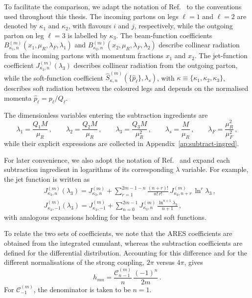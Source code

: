 To facilitate the comparison, we adapt the notation of
Ref.~\cite{Gaunt:2015pea} to the conventions used throughout this
thesis. The incoming partons on legs $\ell=1$ and $\ell=2$ are denoted
by $\kappa_1$ and $\kappa_2$, with flavours $i$ and $j$,
respectively, while the outgoing parton on leg $\ell=3$ is labelled by
$\kappa_3$. The beam-function coefficients
$B_{\kappa_1,n}^{(m)}(x_1,\mu_R,\lambda_F,\lambda_1)$ and
$B_{\kappa_2,n}^{(m)}(x_2,\mu_R,\lambda_F,\lambda_2)$ describe
collinear radiation from the incoming partons with momentum fractions
$x_1$ and $x_2$. The jet-function coefficient
$J_{\kappa_3,n}^{(m)}(\lambda_3)$ describes collinear radiation from the
outgoing parton, while the soft-function coefficient
$\widehat{S}_{\kappa,n}^{(m)}(\{\hat{p}_\ell\},\lambda_s)$, with
$\kappa\equiv\{\kappa_1,\kappa_2,\kappa_3\}$, describes soft radiation
between the coloured legs and depends on the normalised momenta
$\hat{p}_\ell=p_\ell/Q_\ell$. 

The dimensionless variables entering the subtraction ingredients are
\begin{equation}
    \lambda_1 = \frac{Q_1 M}{\mu_R}\,, \qquad
    \lambda_2 = \frac{Q_2 M}{\mu_R}\,, \qquad
    \lambda_3 = \frac{Q_3 M}{\mu_R^2}\,, \qquad
    \lambda_s = \frac{M}{\mu_R}\,, \qquad
    \lambda_F = \frac{\mu_R^2}{\mu_F^2}\,,
\end{equation}
while their explicit expressions are collected in
Appendix~\ref{ap:subtract-ingred}.

For later convenience, we also adopt the notation of
Ref.~\cite{Gaunt:2015pea} and expand each subtraction ingredient in
logarithms of its corresponding $\lambda$ variable. For example, the
jet function is written as
\begin{subequations}
\label{eq:subt-mn-exp}
\begin{align}
    &J_{\kappa_3,n}^{(m)}(\lambda_3) = J_{\kappa_3,n}^{(m)}
    + \sum_{r=1}^{2m-1-n}\frac{(n+r)!}{n!\,r!}\,J_{\kappa_3,n+r}^{(m)}\,\ln^r\!\lambda_3\,, \\
    &J_{\kappa_3,-1}^{(m)}(\lambda_3) =J_{\kappa_3,-1}^{(m)}+\sum_{n=0}^{2m-1}J_{\kappa_3,n}^{(m)}\,\frac{\ln^{n+1}\!\lambda_3}{n+1}\,, 
\end{align}
\end{subequations}
with analogous expansions holding for the beam and soft functions.

To relate the two sets of coefficients, we note that the
\textsc{ARES} coefficients are obtained from the integrated cumulant,
whereas the subtraction coefficients are defined for the differential
distribution. Accounting for this difference and for the different
normalisations of the strong coupling, $2\pi$ versus $4\pi$, gives
\begin{equation}
\label{eq:coeff-convent}
h_{mn}=\frac{\mathcal{C}_{n-1}^{(m)}}{n}\,\frac{(-1)^n}{2m}\,.
\end{equation}
For $\mathcal{C}_{-1}^{(m)}$, the denominator is taken to be $n=1$.

